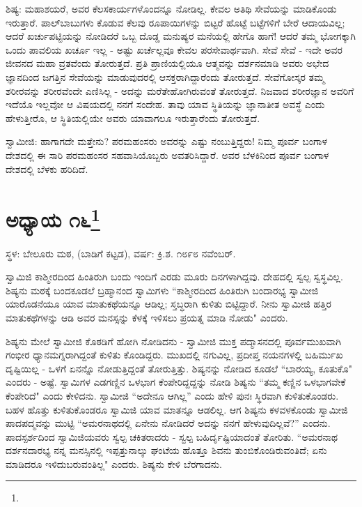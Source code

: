 ಶಿಷ್ಯ: ಮಹಾಶಯರೆ, ಅವರ ಕೆಲಸಕಾರ್ಯಗಳೊಂದನ್ನೂ ನೋಡಿಲ್ಲ. ಕೇವಲ ಅತಿಥಿ ಸೇವೆಯನ್ನು ಮಾಡಿಕೊಂಡು ಇರುತ್ತಾರೆ. ಪಾಲ್‌ಬಾಬುಗಳು ಕೊಡುವ ಕೆಲವು ರೂಪಾಯಿಗಳನ್ನು ಬಿಟ್ಟರೆ ಹೊಟ್ಟೆ ಬಟ್ಟೆಗಳಿಗೆ ಬೇರೆ ಆದಾಯವಿಲ್ಲ; ಆದರೆ ಖರ್ಚುಪಟ್ಟಿಯನ್ನು ನೋಡಿದರೆ ಒಬ್ಬ ದೊಡ್ಡ ಮನುಷ್ಯರ ಮನೆಯಲ್ಲಿ ಹೇಗೊ ಹಾಗೆ! ಆದರೆ ತಮ್ಮ ಭೋಗಕ್ಕಾಗಿ ಒಂದು ಪಾವಲಿಯ ಖರ್ಚೂ ಇಲ್ಲ - ಅಷ್ಟು ಖರ್ಚೆಲ್ಲವೂ ಕೇವಲ ಪರಸೇವಾರ್ಥವಾಗಿ. ಸೇವೆ ಸೇವೆ - ಇದೇ ಅವರ ಜೀವನದ ಮಹಾ ವ್ರತವೆಂದು ತೋರುತ್ತದೆ. ಪ್ರತಿ ಪ್ರಾಣಿಯಲ್ಲಿಯೂ ಆತ್ಮವನ್ನು ದರ್ಶನಮಾಡಿ ಅವರು ಅಭೇದ ಜ್ಞಾನದಿಂದ ಜಗತ್ತಿನ ಸೇವೆಯನ್ನು ಮಾಡುವುದರಲ್ಲಿ ಆಸಕ್ತರಾಗಿದ್ದಾರೆಂದು ತೋರುತ್ತದೆ. ಸೇವೆಗೋಸ್ಕರ ತಮ್ಮ ಶರೀರವನ್ನು ಶರೀರವೆಂದೇ ಎಣಿಸಿಲ್ಲ - ಅದನ್ನು ಮರೆತೇಹೋಗಿರುವಂತೆ ತೋರುತ್ತದೆ. ನಿಜವಾದ ಶರೀರಜ್ಞಾನ ಅವರಿಗೆ ಇದೆಯೊ ಇಲ್ಲವೋ ಆ ವಿಷಯದಲ್ಲಿ ನನಗೆ ಸಂದೇಹ. ತಾವು ಯಾವ ಸ್ಥಿತಿಯನ್ನು ಜ್ಞಾನಾತೀತ ಅವಸ್ಥೆ ಎಂದು ಹೇಳುತ್ತೀರೊ, ಆ ಸ್ಥಿತಿಯಲ್ಲಿಯೇ ಅವರು ಯಾವಾಗಲೂ ಇರುತ್ತಾರೆಂದು ತೋರುತ್ತದೆ.

ಸ್ವಾಮೀಜಿ: ಹಾಗಾಗದೇ ಮತ್ತೇನು? ಪರಮಹಂಸರು ಅವರನ್ನು ಎಷ್ಟು ನಂಬುತ್ತಿದ್ದರು! ನಿಮ್ಮ ಪೂರ್ವ ಬಂಗಾಳ ದೇಶದಲ್ಲಿ ಈ ಸಾರಿ ಪರಮಹಂಸರ ಸಹವಾಸಿಯೊಬ್ಬರು ಅವತರಿಸಿದ್ದಾರೆ. ಅವರ ಬೆಳಕಿನಿಂದ ಪೂರ್ವ ಬಂಗಾಳ ದೇಶದಲ್ಲಿ ಬೆಳಕು ಹರಿದಿದೆ.

\chapter[ಅಧ್ಯಾಯ ೧೬]{ಅಧ್ಯಾಯ ೧೬\protect\footnote{}}

\centerline{ಸ್ಥಳ: ಬೇಲೂರು ಮಠ, (ಬಾಡಿಗೆ ಕಟ್ಟಡ), ವರ್ಷ: ಕ್ರಿ.ಶ. ೧೮೯೮ ನವೆಂಬರ್.}

ಸ್ವಾಮಿಜಿ ಕಾಶ್ಮೀರದಿಂದ ಹಿಂತಿರುಗಿ ಬಂದು ಇಂದಿಗೆ ಎರಡು ಮೂರು ದಿನಗಳಾಗಿದ್ದವು. ದೇಹದಲ್ಲಿ ಸ್ವಲ್ಪ ಸ್ವಸ್ಥವಿಲ್ಲ. ಶಿಷ್ಯನು ಮಠಕ್ಕೆ ಬಂದಕೂಡಲೆ ಬ್ರಹ್ಮಾನಂದ ಸ್ವಾಮಿಗಳು “ಕಾಶ್ಮೀರದಿಂದ ಹಿಂತಿರುಗಿ ಬಂದಾರಭ್ಯ ಸ್ವಾಮೀಜಿ ಯಾರೊಡನೆಯೂ ಯಾವ ಮಾತುಕಥೆಯನ್ನೂ ಆಡಿಲ್ಲ; ಸ್ತಬ್ಧರಾಗಿ ಕುಳಿತು ಬಿಟ್ಟಿದ್ದಾರೆ. ನೀನು ಸ್ವಾಮೀಜಿ ಹತ್ತಿರ ಮಾತುಕಥೆಗಳನ್ನು ಆಡಿ ಅವರ ಮನಸ್ಸನ್ನು ಕೆಳಕ್ಕೆ ಇಳಿಸಲು ಪ್ರಯತ್ನ ಮಾಡಿ ನೋಡು" ಎಂದರು.

ಶಿಷ್ಯನು ಮೇಲೆ ಸ್ವಾಮೀಜಿ ಕೊಠಡಿಗೆ ಹೋಗಿ ನೋಡಿದನು - ಸ್ವಾಮೀಜಿ ಮುಕ್ತ ಪದ್ಮಾಸನದಲ್ಲಿ ಪೂರ್ವಮುಖವಾಗಿ ಗಂಭೀರ ಧ್ಯಾನಮಗ್ನರಾಗಿದ್ದಂತೆ ಕುಳಿತು ಕೊಂಡಿದ್ದರು. ಮುಖದಲ್ಲಿ ನಗುವಿಲ್ಲ, ಪ್ರದೀಪ್ತ ನಯನಗಳಲ್ಲಿ ಬಹಿರ್ಮುಖ ದೃಷ್ಟಿಯಿಲ್ಲ - ಒಳಗೆ ಏನನ್ನೊ ನೋಡುತ್ತಿದ್ದಂತೆ ತೋರುತ್ತಿತ್ತು. ಶಿಷ್ಯನನ್ನು ನೋಡಿದ ಕೂಡಲೆ “ಬಾರಯ್ಯ, ಕೂತುಕೊ" ಎಂದರು - ಅಷ್ಟೆ. ಸ್ವಾಮಿಗಳ ಎಡಗಣ್ಣಿನ ಒಳಭಾಗ ಕೆಂಪೇರಿದ್ದದ್ದನ್ನು ನೋಡಿ ಶಿಷ್ಯನು “ತಮ್ಮ ಕಣ್ಣಿನ ಒಳಭಾಗವೇಕೆ ಕೆಂಪೇರಿದೆ" ಎಂದು ಕೇಳಿದನು. ಸ್ವಾಮೀಜಿ “ಅದೇನೂ ಆಗಿಲ್ಲ” ಎಂದು ಹೇಳಿ ಪುನಃ ಸ್ಥಿರವಾಗಿ ಕುಳಿತುಕೊಂಡರು. ಬಹಳ ಹೊತ್ತು ಕುಳಿತುಕೊಂಡರೂ ಸ್ವಾಮಿಜಿ ಯಾವ ಮಾತನ್ನೂ ಆಡಲಿಲ್ಲ. ಆಗ ಶಿಷ್ಯನು ಕಳವಳಕೊಂಡು ಸ್ವಾಮೀಜಿ ಪಾದಪದ್ಮವನ್ನು ಮುಟ್ಟಿ “ಅಮರನಾಥದಲ್ಲಿ ಏನೇನು ನೋಡಿದರೆ ಅದನ್ನು ನನಗೆ ಹೇಳುವುದಿಲ್ಲವೆ?” ಎಂದನು. ಪಾದಸ್ಪರ್ಶದಿಂದ ಸ್ವಾಮಿಜಿಯವರು ಸ್ವಲ್ಪ ಚಕಿತರಾದರು - ಸ್ವಲ್ಪ ಬಹಿರ್ದೃಷ್ಟಿಯಾದಂತೆ ತೋರಿತು. “ಅಮರನಾಥ ದರ್ಶನದಾರಭ್ಯ ನನ್ನ ಮನಸ್ಸಿನಲ್ಲಿ ಇಪ್ಪತ್ತುನಾಲ್ಕು ಘಂಟೆಯ ಹೊತ್ತೂ ಶಿವನು ತುಂಬಿಕೊಂಡಿರುವಂತಿದೆ; ಏನು ಮಾಡಿದರೂ ಇಳಿದುಬರುವಂತಿಲ್ಲ" ಎಂದರು. ಶಿಷ್ಯನು ಕೇಳಿ ಬೆರಗಾದನು.

